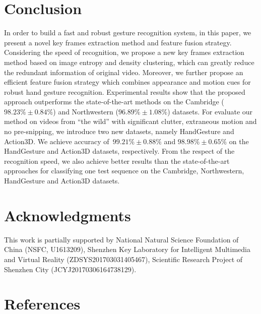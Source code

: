 \documentclass[5p]{elsarticle}
\begin{document}
\section{Conclusion}
\label{sec:concl}
In order to build a fast and robust gesture recognition system, in this paper, we present a novel key frames extraction method and feature fusion strategy.
Considering the speed of recognition, we propose a new key frames extraction method based on image entropy and density clustering, which can greatly reduce the redundant information of original video.
Moreover, we further propose an efficient feature fusion strategy which combines appearance and motion cues for robust hand gesture recognition.
Experimental results show that the proposed approach outperforms the state-of-the-art methods on the Cambridge ($98.23\% \pm 0.84\%$) and Northwestern ($96.89\% \pm 1.08\%$) datasets.
For evaluate our method on videos from ``the wild'' with significant clutter, extraneous motion and no pre-snipping, we introduce two new datasets, namely HandGesture and Action3D.
We achieve accuracy of~$99.21\% \pm 0.88\%$ and $98.98\% \pm 0.65\%$ on the HandGesture and Action3D datasets, respectively.
From the respect of the recognition speed, we also achieve better results than the state-of-the-art approaches for classifying one test sequence on the Cambridge, Northwestern, HandGesture and Action3D datasets.

\section*{Acknowledgments}
This work is partially supported by National Natural Science Foundation of China (NSFC, U1613209),  Shenzhen Key Laboratory for Intelligent Multimedia and Virtual Reality (ZDSYS201703031405467), Scientific Research Project of Shenzhen City (JCYJ20170306164738129).

\section*{References}


\end{document}
